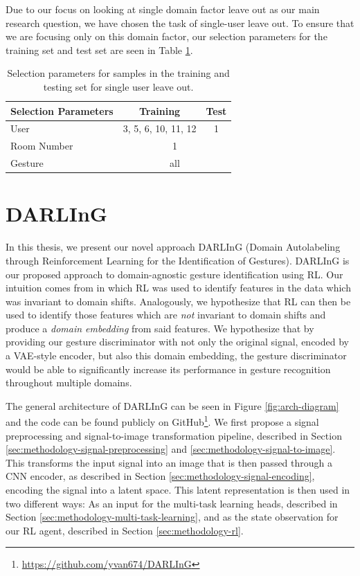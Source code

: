 Due to our focus on looking at single domain factor leave out as our main research question, we have chosen the task of single-user leave out.
To ensure that we are focusing only on this domain factor, our selection parameters for the training set and test set are seen in Table \ref{tab:sulo-params}.

\begin{table}
	\centering
	\begin{tabular}{@{}lcc@{}}
		\toprule
		Selection Parameters & Training            & Test \\ \midrule
		User                 & 3, 5, 6, 10, 11, 12 & 1    \\
		Room Number          & \multicolumn{2}{c}{1}      \\
		Gesture              & \multicolumn{2}{c}{all}    \\ \bottomrule
	\end{tabular}
	\caption{Selection parameters for samples in the training and testing set for single user leave out.}
	\label{tab:sulo-params}
\end{table}

\section{DARLInG}

In this thesis, we present our novel approach DARLInG (Domain Autolabeling through Reinforcement Learning for the Identification of Gestures).
DARLInG is our proposed approach to domain-agnostic gesture identification using RL.
Our intuition comes from \cite{zhang2021adversarial} in which RL was used to identify features in the data which was invariant to domain shifts.
Analogously, we hypothesize that RL can then be used to identify those features which are \textit{not} invariant to domain shifts and produce a \textit{domain embedding} from said features.
We hypothesize that by providing our gesture discriminator with not only the original signal, encoded by a VAE-style encoder, but also this domain embedding, the gesture discriminator would be able to significantly increase its performance in gesture recognition throughout multiple domains.

The general architecture of DARLInG can be seen in Figure \ref{fig:arch-diagram} and the code can be found publicly on GitHub\footnote{\href{https://github.com/yvan674/DARLInG}{https://github.com/yvan674/DARLInG}}.
We first propose a signal preprocessing and signal-to-image transformation pipeline, described in Section \ref{sec:methodology-signal-preprocessing} and \ref{sec:methodology-signal-to-image}.
This transforms the input signal into an image that is then passed through a CNN encoder, as described in Section \ref{sec:methodology-signal-encoding}, encoding the signal into a latent space.
This latent representation is then used in two different ways: As an input for the multi-task learning heads, described in Section \ref{sec:methodology-multi-task-learning}, and as the state observation for our RL agent, described in Section \ref{sec:methodology-rl}.

